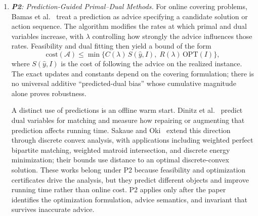 \documentclass[acmsmall,screen,nonacm]{acmart}
\theoremstyle{acmdefinition}%
\begin{document}
\begin{enumerate}
    The parameter $\lambda$ is not a function of the realized error unless that error is observable before the corresponding decision. Adaptive trust needs a causal proxy and a problem-specific analysis; neither a generic cost monitor nor a generic expert algorithm supplies a competitive ratio automatically.

    \emph{Applies when} a robust prediction-free baseline exists and either an up-front mixture or a single parameterized rule yields the stated guarantee. A one-shot mixture draws one branch before execution, so it neither switches online nor requires the two branches to share state. State compatibility and migration cost become additional obligations only for dynamic switching, which is classified under P4. This distinction matters in caching, where separately maintained cache states can be expensive to reconcile.

    \item \emph{\textbf{P2}: Prediction-Guided Primal--Dual Methods.}
    For online covering problems, Bamas et al.~\cite{bamas2020primal} treat a prediction as advice specifying a candidate solution or action sequence. The algorithm modifies the rates at which primal and dual variables increase, with $\lambda$ controlling how strongly the advice influences those rates. Feasibility and dual fitting then yield a bound of the form
    \begin{equation}
       \mathrm{cost}(\mathcal A) \leq
       \min\{C(\lambda)\,S(\hat y,I),\;R(\lambda)\,\mathrm{OPT}(I)\},
    \end{equation}
    where $S(\hat y,I)$ is the cost of following the advice on the realized instance. The exact updates and constants depend on the covering formulation; there is no universal additive ``predicted-dual bias'' whose cumulative magnitude alone proves robustness.

    A distinct use of predictions is an offline warm start. Dinitz et al.~\cite{dinitz2021duals} predict dual variables for matching and measure how repairing or augmenting that prediction affects running time. Sakaue and Oki~\cite{sakaue2022dca} extend this direction through discrete convex analysis, with applications including weighted perfect bipartite matching, weighted matroid intersection, and discrete energy minimization; their bounds use distance to an optimal discrete-convex solution. These works belong under P2 because feasibility and optimization certificates drive the analysis, but they predict different objects and improve running time rather than online cost. P2 applies only after the paper identifies the optimization formulation, advice semantics, and invariant that survives inaccurate advice.


\end{enumerate}
\end{document}
